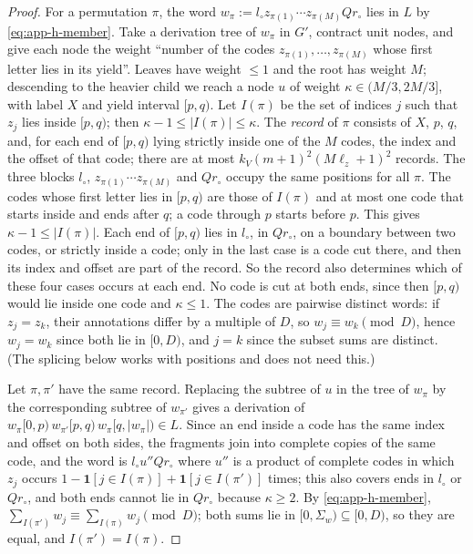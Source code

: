 \begin{proof}
For a permutation $\pi$, the word $w_\pi:=l_\circ z_{\pi(1)}\cdots
z_{\pi(M)}Qr_\circ$ lies in $L$ by \eqref{eq:app-h-member}.  Take a
derivation tree of $w_\pi$ in $G'$, contract unit nodes, and give each node the
weight ``number of the codes $z_{\pi(1)},\ldots,z_{\pi(M)}$ whose first letter
lies in its yield''.  Leaves have weight $\le1$ and the root has weight $M$;
descending to the heavier child we reach a node $u$ of weight
$\kappa\in(M/3,2M/3]$, with label $X$ and yield interval $[p,q)$.  Let $I(\pi)$
be the set of indices $j$ such that $z_j$ lies inside $[p,q)$; then
$\kappa-1\le|I(\pi)|\le\kappa$.  The \emph{record} of $\pi$ consists of $X$,
$p$, $q$, and, for each end of $[p,q)$ lying strictly inside one of the $M$
codes, the index and the offset of that code; there are at most
$k_V(m+1)^2(M\ell_z+1)^2$ records.  The three blocks $l_\circ$, $z_{\pi(1)}\cdots
z_{\pi(M)}$ and $Qr_\circ$ occupy the same positions for all $\pi$.  The codes
whose first letter lies in $[p,q)$ are those of $I(\pi)$ and at most one code
that starts inside and ends after $q$; a code through $p$ starts before $p$.
This gives $\kappa-1\le|I(\pi)|$.  Each end of $[p,q)$ lies in $l_\circ$, in
$Qr_\circ$, on a boundary between two codes, or strictly inside a code; only in
the last case is a code cut there, and then its index and offset are part of the
record.  So the record also determines which of these four cases occurs at each
end.  No code is cut at both ends, since then $[p,q)$ would lie inside one code
and $\kappa\le1$.  The codes are pairwise distinct words: if $z_j=z_k$, their
annotations differ by a multiple of $D$, so $w_j\equiv w_k\pmod D$, hence
$w_j=w_k$ since both lie in $[0,D)$, and $j=k$ since the subset sums are
distinct.  (The splicing below works with positions and does not need this.)

Let $\pi,\pi'$ have the same record.  Replacing the subtree of $u$ in the tree
of $w_\pi$ by the corresponding subtree of $w_{\pi'}$ gives a derivation of
$w_\pi[0,p)\,w_{\pi'}[p,q)\,w_\pi[q,|w_\pi|)\in L$.  Since an end inside a code
has the same index and offset on both sides, the fragments join into complete
copies of the same code, and the word is $l_\circ u''Qr_\circ$ where $u''$ is a
product of complete codes in which $z_j$ occurs
$1-\mathbf 1[j\in I(\pi)]+\mathbf 1[j\in I(\pi')]$ times; this also covers ends
in $l_\circ$ or $Qr_\circ$, and both ends cannot lie in $Qr_\circ$ because
$\kappa\ge2$.  By \eqref{eq:app-h-member},
$\sum_{I(\pi')}w_j\equiv\sum_{I(\pi)}w_j\pmod D$; both sums lie in
$[0,\Sigma_w)\subseteq[0,D)$, so they are equal, and $I(\pi')=I(\pi)$.


\end{proof}
